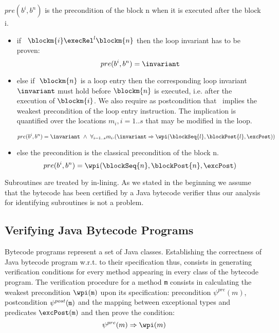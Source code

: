 \begin{defn}\label{post2}
$pre(b^{i}, b^{n})$ is the precondition of the block n when it is executed after the block i.
\begin{itemize}

\item if \ $\blockm{i} \execRel^l \blockm{n}$ 
then the loop invariant has to be proven:
$$
pre(b^{i}, b^{n}) =  \invariant
$$

\item else if $\ \blockm{n}$ is a loop entry then the corresponding loop invariant $\invariant$ must hold before $\blockm{n}$ is executed, i.e. after the execution of $\blockm{i}$. We also require as postcondition that \invariant \ implies the weakest precondition of the loop entry instruction. The implication is quantified over the locations $m_i , i= 1..s$ that may be modified in the loop.

$$
pre(b^{i}, b^{n}) = \invariant \ \wedge \ \forall_{i = 1..s} m_i.(
\invariant \Rightarrow \wpi(\blockSeq{l},\blockPost{l},\excPost))
$$
\item else the precondition is the classical precondition of the block n. 
$$
pre(b^{i}, b^{n}) = \wpi( \blockSeq{n} ,  \blockPost{n}, \excPost)
$$
\end{itemize}
\end{defn}
Subroutines are treated by in-lining. As we stated in the beginning we assume that the bytecode has been certified by a Java
bytecode verifier thus our analysis for identifying  subroutines is not a problem.  


\subsection{Verifying Java Bytecode Programs} Bytecode programs represent a set of Java classes. Establishing the correctness of Java bytecode program w.r.t. to their specification thus, consists in generating verification conditions for every method appearing in every class of the bytecode program.
The verification procedure for a method \texttt{m} consists in  calculating the weakest precondition $\wpi(\tt{m})$ upon its specification: precondition $\psi^{pre}(m)$, 
postcondition $\psi^{post}(\tt{m})$ and the mapping between exceptional types and predicates $\excPost(\tt{m})$ and then prove the condition: 
$$
\psi^{pre}(m)  \Rightarrow \wpi(m)
$$    

